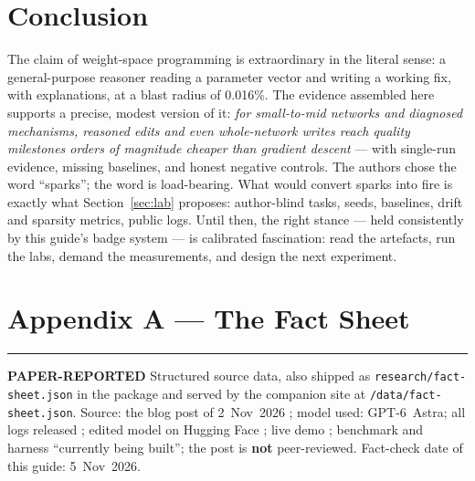 \documentclass[11pt,a4paper]{article}
\newcommand{\bP}{\textcolor{wspblue}{\rule[0.12ex]{1.5mm}{1.5mm}}\;\textcolor{wspblue}{\textbf{PAPER-REPORTED}}}
\begin{document}
\section{Conclusion}\label{sec:conclusion}

The claim of weight-space programming is extraordinary in the literal sense: a general-purpose reasoner reading a parameter vector and writing a working fix, with explanations, at a blast radius of 0.016\%. The evidence assembled here supports a precise, modest version of it: \emph{for small-to-mid networks and diagnosed mechanisms, reasoned edits and even whole-network writes reach quality milestones orders of magnitude cheaper than gradient descent} --- with single-run evidence, missing baselines, and honest negative controls. The authors chose the word ``sparks''; the word is load-bearing. What would convert sparks into fire is exactly what Section~\ref{sec:lab} proposes: author-blind tasks, seeds, baselines, drift and sparsity metrics, public logs. Until then, the right stance --- held consistently by this guide's badge system --- is calibrated fascination: read the artefacts, run the labs, demand the measurements, and design the next experiment.

\appendix
\FloatBarrier

\section{Appendix A --- The Fact Sheet}\label{app:factsheet}

\bP\; Structured source data, also shipped as \texttt{research/fact-sheet.json} in the package and served by the companion site at \texttt{/data/fact-sheet.json}. Source: the blog post of 2~Nov~2026 \cite{wsp-post}; model used: GPT-6~Astra; all logs released \cite{wsp-logs}; edited model on Hugging Face \cite{wsp-model}; live demo \cite{wsp-demo}; benchmark and harness ``currently being built''; the post is \textbf{not} peer-reviewed. Fact-check date of this guide: 5~Nov~2026.
\end{document}
